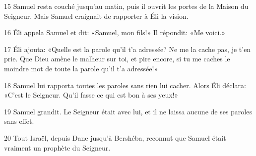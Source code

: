 
15 Samuel resta couché jusqu’au matin, puis il ouvrit les portes de la Maison du Seigneur. Mais Samuel craignait de rapporter à Éli la vision.

16 Éli appela Samuel et dit: «Samuel, mon fils!» Il répondit: «Me voici.»

17 Éli ajouta: «Quelle est la parole qu’il t’a adressée? Ne me la cache pas, je t’en prie. Que Dieu amène le malheur sur toi, et pire encore, si tu me caches le moindre mot de toute la parole qu’il t’a adressée!»

18 Samuel lui rapporta toutes les paroles sans rien lui cacher. Alors Éli déclara: «C’est le Seigneur. Qu’il fasse ce qui est bon à ses yeux!»

19 Samuel grandit. Le Seigneur était avec lui, et il ne laissa aucune de ses paroles sans effet.

20 Tout Israël, depuis Dane jusqu’à Bershéba, reconnut que Samuel était vraiment un prophète du Seigneur.